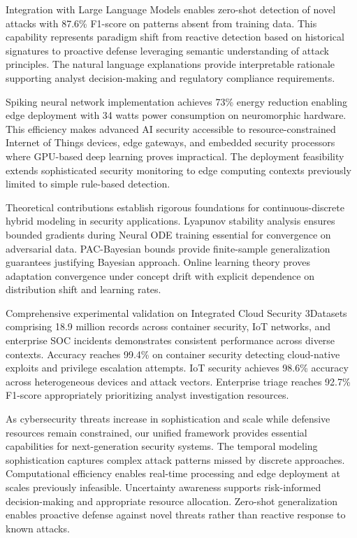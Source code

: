 \documentclass[10pt,journal,compsoc]{IEEEtran}
\begin{document}
Integration with Large Language Models enables zero-shot detection of novel attacks with 87.6\% F1-score on patterns absent from training data. This capability represents paradigm shift from reactive detection based on historical signatures to proactive defense leveraging semantic understanding of attack principles. The natural language explanations provide interpretable rationale supporting analyst decision-making and regulatory compliance requirements.

Spiking neural network implementation achieves 73\% energy reduction enabling edge deployment with 34 watts power consumption on neuromorphic hardware. This efficiency makes advanced AI security accessible to resource-constrained Internet of Things devices, edge gateways, and embedded security processors where GPU-based deep learning proves impractical. The deployment feasibility extends sophisticated security monitoring to edge computing contexts previously limited to simple rule-based detection.

Theoretical contributions establish rigorous foundations for continuous-discrete hybrid modeling in security applications. Lyapunov stability analysis ensures bounded gradients during Neural ODE training essential for convergence on adversarial data. PAC-Bayesian bounds provide finite-sample generalization guarantees justifying Bayesian approach. Online learning theory proves adaptation convergence under concept drift with explicit dependence on distribution shift and learning rates.

Comprehensive experimental validation on Integrated Cloud Security 3Datasets comprising 18.9 million records across container security, IoT networks, and enterprise SOC incidents demonstrates consistent performance across diverse contexts. Accuracy reaches 99.4\% on container security detecting cloud-native exploits and privilege escalation attempts. IoT security achieves 98.6\% accuracy across heterogeneous devices and attack vectors. Enterprise triage reaches 92.7\% F1-score appropriately prioritizing analyst investigation resources.

As cybersecurity threats increase in sophistication and scale while defensive resources remain constrained, our unified framework provides essential capabilities for next-generation security systems. The temporal modeling sophistication captures complex attack patterns missed by discrete approaches. Computational efficiency enables real-time processing and edge deployment at scales previously infeasible. Uncertainty awareness supports risk-informed decision-making and appropriate resource allocation. Zero-shot generalization enables proactive defense against novel threats rather than reactive response to known attacks.
\end{document}
